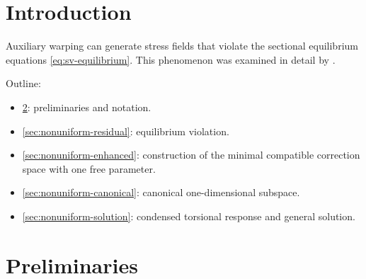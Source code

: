
\section{Introduction}
\label{sec:nonuniform-intro}

Auxiliary warping can generate stress fields that violate the sectional equilibrium equations \eqref{eq:sv-equilibrium}. 
This phenomenon was examined in detail by \cite{armero2021modeling}. 

Outline:
\begin{itemize}
    \item \cref{sec:nonuniform-prelim}: preliminaries and notation.
    \item \cref{sec:nonuniform-residual}: equilibrium violation.
    \item \cref{sec:nonuniform-enhanced}: construction of the minimal compatible correction space with one free parameter.
    \item \cref{sec:nonuniform-canonical}: canonical one-dimensional subspace.
    \item \cref{sec:nonuniform-solution}: condensed torsional response and general solution.
\end{itemize}


\section{Preliminaries}
\label{sec:nonuniform-prelim}

